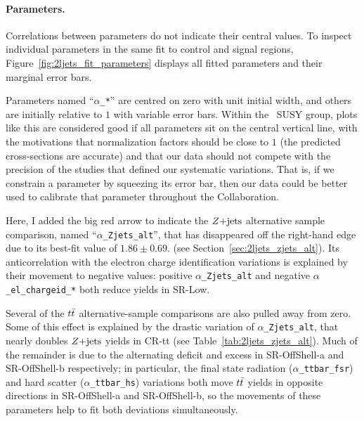 \paragraph{Parameters.}
Correlations between parameters do not indicate their central values.
To inspect individual parameters in the same fit to control and signal regions,
Figure~\ref{fig:2ljets_fit_parameters} displays all fitted parameters and their
marginal error bars.

Parameters named ``\texttt{$\alpha$\_*}'' are centred on zero with unit initial
width, and others are initially relative to $1$ with variable error bars.
Within the \atlas\ SUSY group, plots like this are considered good if all
parameters sit on the central vertical line, with the motivations that
normalization factors should be close to $1$ (the predicted cross-sections are
accurate) and that our data should not compete with the precision of the
studies that defined our systematic variations.
That is, if we constrain a parameter by squeezing its error bar, then our data
could be better used to calibrate that parameter throughout the Collaboration.

Here, I added the big red arrow to indicate the $Z\mathrm{+jets}$ alternative sample
comparison, named ``\texttt{$\alpha$\_Zjets\_alt}'', that has disappeared off
the right-hand edge due to its best-fit value of $1.86 \pm 0.69$.
(see Section~\ref{sec:2ljets_zjets_alt}).
Its anticorrelation with the electron charge identification variations is
explained by their movement to negative values:
positive \texttt{$\alpha$\_Zjets\_alt} and negative
\texttt{$\alpha$\_el\_chargeid\_*} both reduce yields in SR-Low.

Several of the $t\bar t$ alternative-sample comparisons are also pulled away
from zero.
Some of this effect is explained by the drastic variation of
\texttt{$\alpha$\_Zjets\_alt}, that nearly doubles $Z\mathrm{+jets}$ yields in CR-tt
(see Table~\ref{tab:2ljets_zjets_alt}).
Much of the remainder is due to the alternating deficit and excess in
SR-OffShell-a and SR-OffShell-b respectively;
in particular, the
final state radiation (\texttt{$\alpha$\_ttbar\_fsr}) and
hard scatter (\texttt{$\alpha$\_ttbar\_hs}) variations both move $t\bar t$
yields in opposite directions in SR-OffShell-a and SR-OffShell-b, so the
movements of these parameters help to fit both deviations simultaneously.

